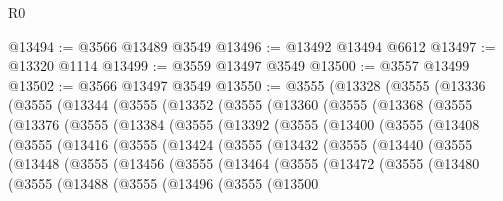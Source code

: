 \begin{lexlean}{R0}
\begin{coremodule}
@13494 := @3566 @13489 @3549
@13496 := @13492 @13494 @6612
@13497 := @13320 @1114
@13499 := @3559 @13497 @3549
@13500 := @3557 @13499
@13502 := @3566 @13497 @3549
@13550 := @3555
    (@13328
      (@3555
        (@13336
          (@3555
            (@13344
              (@3555
                (@13352
                  (@3555
                    (@13360
                      (@3555
                        (@13368
                          (@3555
                            (@13376
                              (@3555
                                (@13384
                                  (@3555
                                    (@13392
                                      (@3555
                                        (@13400
                                          (@3555
                                            (@13408
                                              (@3555
                                                (@13416
                                                  (@3555
                                                    (@13424
                                                      (@3555
                                                        (@13432
                                                          (@3555
                                                            (@13440
                                                              (@3555
                                                                (@13448
                                                                  (@3555
                                                                    (@13456
                                                                      (@3555
                                                                        (@13464
                                                                          (@3555
                                                                            (@13472
                                                                              (@3555
                                                                                (@13480
                                                                                  (@3555
                                                                                    (@13488
                                                                                      (@3555
                                                                                        (@13496
                                                                                          (@3555
                                                                                            (@13500

\end{coremodule}
\end{lexlean}
